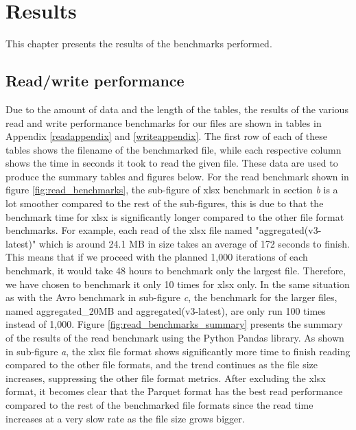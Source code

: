 \section{Results}
\label{sec:results}
This chapter presents the results of the benchmarks performed.

\subsection{Read/write performance}
Due to the amount of data and the length of the tables, the results of the various read and write performance benchmarks for our files are shown in tables in Appendix \ref{readappendix} and \ref{writeappendix}. The first row of each of these tables shows the filename of the benchmarked file, while each respective column shows the time in seconds it took to read the given file. These data are used to produce the summary tables and figures below. For the read benchmark shown in figure \ref{fig:read_benchmarks}, the sub-figure of xlsx benchmark in section \textit{b} is a lot smoother compared to the rest of the sub-figures, this is due to that the benchmark time for xlsx is significantly longer compared to the other file format benchmarks. For example, each read of the xlsx file named "aggregated(v3-latest)" which is around 24.1 MB in size takes an average of 172 seconds to finish. This means that if we proceed with the planned 1,000 iterations of each benchmark, it would take 48 hours to benchmark only the largest file. Therefore, we have chosen to benchmark it only 10 times for xlsx only. In the same situation as with the Avro benchmark in sub-figure \textit{c}, the benchmark for the larger files, named aggregated\_20MB and aggregated(v3-latest), are only run 100 times instead of 1,000. Figure \ref{fig:read_benchmarks_summary} presents the summary of the results of the read benchmark using the Python Pandas library. As shown in sub-figure \textit{a}, the xlsx file format shows significantly more time to finish reading compared to the other file formats, and the trend continues as the file size increases, suppressing the other file format metrics. After excluding the xlsx format, it becomes clear that the Parquet format has the best read performance compared to the rest of the benchmarked file formats since the read time increases at a very slow rate as the file size grows bigger.

